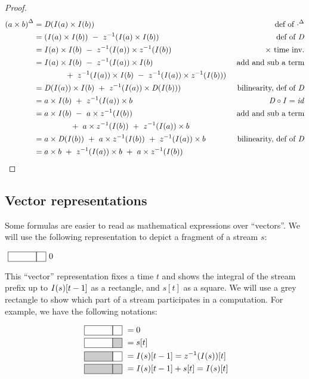 \begin{proof}
$$
\begin{aligned}
{(a \times b)}^{\Delta} &= \mathit{D}(\mathit{I}(a) \times \mathit{I}(b)) & \mbox{def of } {\cdot}^{\Delta} \\
             &= (\mathit{I}(a) \times \mathit{I}(b)) ~-~  z^{-1}(\mathit{I}(a) \times \mathit{I}(b)) & \mbox{def of } \mathit{D} \\
             &= \mathit{I}(a) \times \mathit{I}(b) ~-~  z^{-1}(\mathit{I}(a)) \times z^{-1}(\mathit{I}(b)) & \times \mbox{ time inv.}\\
             &= \mathit{I}(a) \times \mathit{I}(b) ~-~  z^{-1}(\mathit{I}(a)) \times \mathit{I}(b) & \mbox{ add and sub a term} \\
             & ~~~~~~~~~~~~+~ z^{-1}(\mathit{I}(a)) \times \mathit{I}(b) ~-~ z^{-1}(\mathit{I}(a)) \times z^{-1}(\mathit{I}(b))) & \\
             &= \mathit{D}(\mathit{I}(a)) \times \mathit{I}(b) ~+~ z^{-1}(\mathit{I}(a)) \times \mathit{D}(\mathit{I}(b))) & \mbox{bilinearity, def of }\mathit{D} \\ 
             &= a \times \mathit{I}(b) ~+~ z^{-1}(\mathit{I}(a)) \times b & \mathit{D} \circ \mathit{I} = \mathit{id} \\ 
             &= a \times \mathit{I}(b) ~-~ a \times z^{-1}(\mathit{I}(b)) & \mbox{ add and sub a term} \\
             &     ~~~~~~~~~~~~~~+~ a \times z^{-1}(\mathit{I}(b)) ~+~ z^{-1}(\mathit{I}(a)) \times b & \\        
             &= a \times \mathit{D}(\mathit{I}(b)) ~+~ a \times z^{-1}(\mathit{I}(b)) ~+~ z^{-1}(\mathit{I}(a)) \times b & \mbox{bilinearity, def of }\mathit{D}  \\     
             &= a \times b  ~+~ z^{-1}(\mathit{I}(a)) \times b ~+~ a \times z^{-1}(\mathit{I}(b)) 
\end{aligned}
$$
\end{proof}

\subsection{Vector representations}\label{sec:vector-picture}

Some formulas are easier to read as mathematical expressions over ``vectors''.
We will use the following representation to depict a fragment of a stream $s$:

$\strm{0}{0}$

This ``vector'' representation fixes a time $t$ and shows the integral of the stream prefix
up to $\mathit{I}(s)[t-1]$ as a rectangle, and $s[t]$ as a square.  We will use a grey rectangle to 
show which part of a stream participates in a computation.  For example, we have the following
notations:

$$
\begin{aligned}
\strm{0 0} &= 0 \\
\strm{0 1} &= s[t] \\
\strm{1 0} &= \I(s)[t-1] = \zm(\I(s))[t] \\
\strm{1 1} &= \I(s)[t-1] + s[t] = \I(s)[t] 
\end{aligned}
$$

